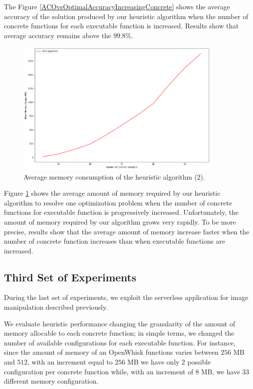 \documentclass[12pt,a4paper]{report}
\begin{document}
The Figure \ref{ACOvsOptimalAccuracyIncreasingConcrete} shows the average accuracy of the solution produced by our heuristic algorithm when the number of concrete functions for each executable function is increased. Results show that average accuracy remains above the $99.8$\%.

\begin{figure}[h]
	\centering
	\includegraphics[width=0.9\textwidth]{./experiments/ACORamConsumptionIncreasingConcrete.png}
	\caption{Average memory consumption of the heuristic algorithm (2).}%
	\label{ACORamConsumptionIncreasingConcrete}
\end{figure}

Figure \ref{ACORamConsumptionIncreasingConcrete} shows the average amount of memory required by our heuristic algorithm to resolve one optimization problem when the number of concrete functions for executable function is progressively increased. Unfortunately, the amount of memory required by our algorithm grows very rapidly. To be more precise, results show that the average amount of memory increase faster when the number of concrete function increases than when executable functions are increased.

\newpage
\subsection{Third Set of Experiments}

During the last set of experiments, we exploit the serverless application for image manipulation described previously.

We evaluate heuristic performance changing the granularity of the amount of memory allocable to each concrete function; in simple terms, we changed the number of available configurations for each executable function. For instance, since the amount of memory of an OpenWhisk functions varies between $256$ MB and $512$, with an increment equal to $256$ MB we have only $2$ possible configuration per concrete function while, with an increment of $8$ MB, we have $33$ different memory configuration.
\end{document}
